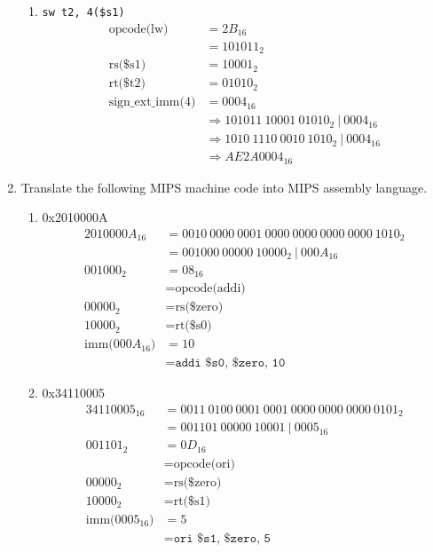\documentclass[12pt]{article}
\begin{document}
\begin{enumerate}
\begin{enumerate}
      \item \texttt{sw t2, 4(\$s1)}
      \begin{align*}
        \text{opcode(lw)} &= 2B_{16} \\
        &= 101011_2\\
        \text{rs(\$s1)} &= 10001_2 \\
        \text{rt(\$t2)} &= 01010_2\\
        \text{sign\_ext\_imm(4)} &= 0004_{16} \\
        &\Rightarrow 101011 \ 10001 \ 01010_2 \ | \ 0004_{16}\\
        &\Rightarrow 1010 \ 1110 \ 0010 \ 1010_2 \ | \ 0004_{16}\\
        &\Rightarrow AE2A0004_{16}
      \end{align*}

    \end{enumerate}

    \item Translate the following MIPS machine code into MIPS assembly language.

    \begin{enumerate}

      \item 0x2010000A
      \begin{align*}
        2010000A_{16} &= 0010 \ 0000 \ 0001 \ 0000 \ 0000 \ 0000 \ 0000 \ 1010_2\\
        &= 001000 \ 00000 \ 10000_2 \ | \ 000A_{16}\\
        001000_2 &= 08_{16}\\
        &= \text{opcode(addi)}\\
        00000_2 &= \text{rs(\$zero)} \\
        10000_2 &= \text{rt(\$s0)} \\
        \text{imm($000A_{16}$)} &= 10\\
        &= \texttt{addi \$s0, \$zero, 10}
      \end{align*}

      \item 0x34110005
      \begin{align*}
        34110005_{16} &= 0011 \ 0100 \ 0001 \ 0001 \ 0000 \ 0000 \ 0000 \ 0101_2\\
        &= 001101 \ 00000 \ 10001 \ | \ 0005_{16}\\
        001101_2 &= 0D_{16}\\
        &= \text{opcode(ori)}\\
        00000_2 &= \text{rs(\$zero)} \\
        10000_2 &= \text{rt(\$s1)} \\
        \text{imm($0005_{16}$)} &= 5\\
        &= \texttt{ori \$s1, \$zero, 5}
      \end{align*}


\end{enumerate}
\end{enumerate}
\end{document}
